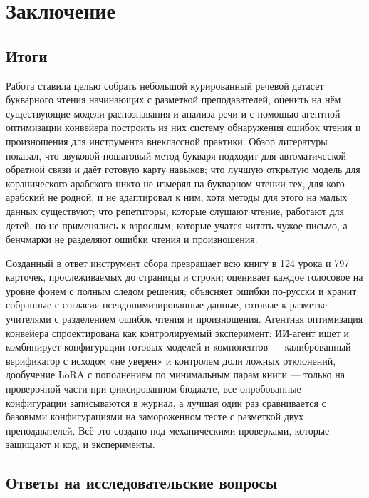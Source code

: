 \chapter{Заключение}\label{ch:concl}

\section{Итоги}

Работа ставила целью собрать небольшой курированный речевой датасет букварного чтения начинающих с разметкой
преподавателей, оценить на нём существующие модели распознавания и анализа речи и с помощью агентной оптимизации конвейера построить из них систему обнаружения ошибок чтения и произношения для инструмента внеклассной практики. Обзор литературы
показал, что звуковой пошаговый метод букваря подходит для автоматической обратной связи и даёт готовую карту
навыков; что лучшую открытую модель для коранического арабского никто не измерял на букварном чтении тех, для
кого арабский не родной, и не адаптировал к ним, хотя методы для этого на малых данных существуют; что
репетиторы, которые слушают чтение, работают для детей, но не применялись к взрослым, которые учатся читать чужое письмо, а бенчмарки не разделяют ошибки чтения и произношения.

Созданный в ответ инструмент сбора превращает всю книгу в 124 урока и 797 карточек, прослеживаемых до страницы
и строки; оценивает каждое голосовое на уровне фонем с полным следом решения; объясняет ошибки по-русски и
хранит собранные с согласия псевдонимизированные данные, готовые к разметке учителями с разделением ошибок
чтения и произношения. Агентная оптимизация конвейера спроектирована как контролируемый эксперимент: ИИ-агент
ищет и комбинирует конфигурации готовых моделей и компонентов --- калиброванный верификатор с исходом «не уверен» и
контролем доли ложных отклонений, дообучение LoRA с пополнением по минимальным парам книги --- только на проверочной части при фиксированном бюджете, все опробованные конфигурации записываются в журнал, а лучшая один раз сравнивается с базовыми конфигурациями на замороженном тесте с разметкой двух преподавателей. Всё это создано под
механическими проверками, которые защищают и код, и эксперименты.

\section{Ответы на исследовательские вопросы}

